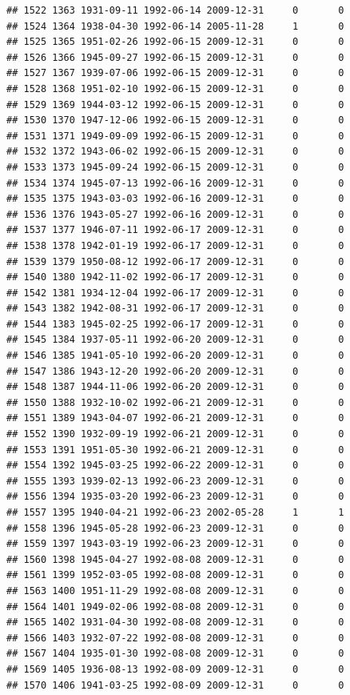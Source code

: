 \documentclass[
]{book}
\begin{document}
\begin{verbatim}
## 1522 1363 1931-09-11 1992-06-14 2009-12-31     0       0
## 1524 1364 1938-04-30 1992-06-14 2005-11-28     1       0
## 1525 1365 1951-02-26 1992-06-15 2009-12-31     0       0
## 1526 1366 1945-09-27 1992-06-15 2009-12-31     0       0
## 1527 1367 1939-07-06 1992-06-15 2009-12-31     0       0
## 1528 1368 1951-02-10 1992-06-15 2009-12-31     0       0
## 1529 1369 1944-03-12 1992-06-15 2009-12-31     0       0
## 1530 1370 1947-12-06 1992-06-15 2009-12-31     0       0
## 1531 1371 1949-09-09 1992-06-15 2009-12-31     0       0
## 1532 1372 1943-06-02 1992-06-15 2009-12-31     0       0
## 1533 1373 1945-09-24 1992-06-15 2009-12-31     0       0
## 1534 1374 1945-07-13 1992-06-16 2009-12-31     0       0
## 1535 1375 1943-03-03 1992-06-16 2009-12-31     0       0
## 1536 1376 1943-05-27 1992-06-16 2009-12-31     0       0
## 1537 1377 1946-07-11 1992-06-17 2009-12-31     0       0
## 1538 1378 1942-01-19 1992-06-17 2009-12-31     0       0
## 1539 1379 1950-08-12 1992-06-17 2009-12-31     0       0
## 1540 1380 1942-11-02 1992-06-17 2009-12-31     0       0
## 1542 1381 1934-12-04 1992-06-17 2009-12-31     0       0
## 1543 1382 1942-08-31 1992-06-17 2009-12-31     0       0
## 1544 1383 1945-02-25 1992-06-17 2009-12-31     0       0
## 1545 1384 1937-05-11 1992-06-20 2009-12-31     0       0
## 1546 1385 1941-05-10 1992-06-20 2009-12-31     0       0
## 1547 1386 1943-12-20 1992-06-20 2009-12-31     0       0
## 1548 1387 1944-11-06 1992-06-20 2009-12-31     0       0
## 1550 1388 1932-10-02 1992-06-21 2009-12-31     0       0
## 1551 1389 1943-04-07 1992-06-21 2009-12-31     0       0
## 1552 1390 1932-09-19 1992-06-21 2009-12-31     0       0
## 1553 1391 1951-05-30 1992-06-21 2009-12-31     0       0
## 1554 1392 1945-03-25 1992-06-22 2009-12-31     0       0
## 1555 1393 1939-02-13 1992-06-23 2009-12-31     0       0
## 1556 1394 1935-03-20 1992-06-23 2009-12-31     0       0
## 1557 1395 1940-04-21 1992-06-23 2002-05-28     1       1
## 1558 1396 1945-05-28 1992-06-23 2009-12-31     0       0
## 1559 1397 1943-03-19 1992-06-23 2009-12-31     0       0
## 1560 1398 1945-04-27 1992-08-08 2009-12-31     0       0
## 1561 1399 1952-03-05 1992-08-08 2009-12-31     0       0
## 1563 1400 1951-11-29 1992-08-08 2009-12-31     0       0
## 1564 1401 1949-02-06 1992-08-08 2009-12-31     0       0
## 1565 1402 1931-04-30 1992-08-08 2009-12-31     0       0
## 1566 1403 1932-07-22 1992-08-08 2009-12-31     0       0
## 1567 1404 1935-01-30 1992-08-08 2009-12-31     0       0
## 1569 1405 1936-08-13 1992-08-09 2009-12-31     0       0
## 1570 1406 1941-03-25 1992-08-09 2009-12-31     0       0

\end{verbatim}
\end{document}
